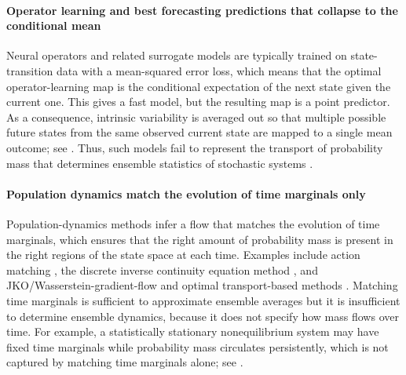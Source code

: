 \documentclass[oneside,11pt]{article}
\theoremstyle{remark}
\begin{document}
\paragraph{Operator learning and best forecasting predictions that collapse to the conditional mean}
Neural operators and related surrogate models \cite{Lu2021,li2021fourier} 
are typically trained on state-transition data with a mean-squared error loss, which means that the optimal operator-learning map is the conditional expectation of the next state given the current one. This gives a fast model, but the resulting map is a point predictor. As a consequence, intrinsic variability is averaged out so that multiple possible future states from the same observed current state are mapped to a single mean outcome; see . Thus, such models fail to represent the transport of probability mass that determines ensemble statistics of stochastic systems 
\cite{jiang2023training,pmlr-v235-chen24n,molinaro2025generativeaifastaccurate}. 


\paragraph{Population dynamics match the evolution of time marginals only} Population-dynamics methods infer a flow that matches the evolution of time marginals, which ensures that the right amount of probability mass is present in the right regions of the state space at each time. Examples include action matching 
\cite{neklyudov2023action,berman2024parametric},
the discrete inverse continuity equation method 
\cite{blickhan-berman-stuart-etal:2025}, and 
JKO/Wasserstein-gradient-flow and optimal transport-based methods
\cite{tong2020trajectorynet,bunne2022proximal,terpin2024learning}. Matching time marginals is sufficient to approximate ensemble averages but it is insufficient to determine ensemble dynamics, because it does not specify how mass flows over time. For example, a statistically stationary nonequilibrium system may have fixed time marginals while probability mass circulates persistently, which is not captured by matching time marginals alone; see .
\end{document}
